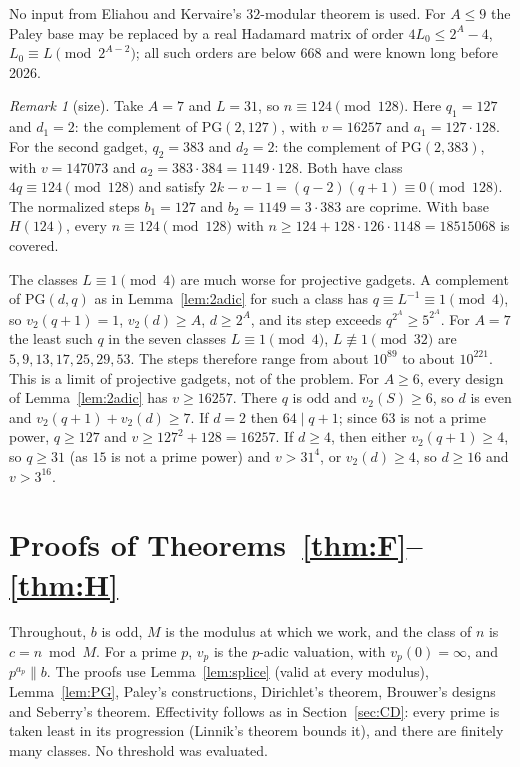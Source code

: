 \documentclass[10pt]{article}
\theoremstyle{remark}
\newtheorem*{remark}{Remark}
\newcommand{\PG}{\mathrm{PG}}
\begin{document}
No input from Eliahou and Kervaire's $32$-modular theorem is used. For $A\le9$ the Paley base may be replaced by a real Hadamard matrix of order $4L_0\le2^A-4$, $L_0\equiv L\pmod{2^{A-2}}$; all such orders are below $668$ and were known long before 2026.

\begin{remark}[size]\label{rem:size}
Take $A=7$ and $L=31$, so $n\equiv124\pmod{128}$. Here $q_1=127$ and $d_1=2$: the complement of $\PG(2,127)$, with $v=16257$ and $a_1=127\cdot128$. For the second gadget, $q_2=383$ and $d_2=2$: the complement of $\PG(2,383)$, with $v=147073$ and $a_2=383\cdot384=1149\cdot128$. Both have class $4q\equiv124\pmod{128}$ and satisfy $2k-v-1=(q-2)(q+1)\equiv0\pmod{128}$. The normalized steps $b_1=127$ and $b_2=1149=3\cdot383$ are coprime. With base $H(124)$, every $n\equiv124\pmod{128}$ with $n\ge124+128\cdot126\cdot1148=18515068$ is covered.

The classes $L\equiv1\pmod4$ are much worse for projective gadgets. A complement of $\PG(d,q)$ as in Lemma~\ref{lem:2adic} for such a class has $q\equiv L^{-1}\equiv1\pmod4$, so $v_2(q+1)=1$, $v_2(d)\ge A$, $d\ge2^A$, and its step exceeds $q^{2^A}\ge5^{2^A}$. For $A=7$ the least such $q$ in the seven classes $L\equiv1\pmod 4$, $L\not\equiv1\pmod{32}$ are $5,9,13,17,25,29,53$. The steps therefore range from about $10^{89}$ to about $10^{221}$. This is a limit of projective gadgets, not of the problem. For $A\ge6$, every design of Lemma~\ref{lem:2adic} has $v\ge16257$. There $q$ is odd and $v_2(S)\ge6$, so $d$ is even and $v_2(q+1)+v_2(d)\ge7$. If $d=2$ then $64\mid q+1$; since $63$ is not a prime power, $q\ge127$ and $v\ge127^2+128=16257$. If $d\ge4$, then either $v_2(q+1)\ge4$, so $q\ge31$ (as $15$ is not a prime power) and $v>31^4$, or $v_2(d)\ge4$, so $d\ge16$ and $v>3^{16}$.
\end{remark}

\section{Proofs of Theorems~\ref{thm:F}--\ref{thm:H}}\label{sec:FGH}
Throughout, $b$ is odd, $M$ is the modulus at which we work, and the class of $n$ is $c=n\bmod M$. For a prime $p$, $v_p$ is the $p$-adic valuation, with $v_p(0)=\infty$, and $p^{a_p}\parallel b$. The proofs use Lemma~\ref{lem:splice} (valid at every modulus), Lemma~\ref{lem:PG}, Paley's constructions, Dirichlet's theorem, Brouwer's designs and Seberry's theorem. Effectivity follows as in Section~\ref{sec:CD}: every prime is taken least in its progression (Linnik's theorem bounds it), and there are finitely many classes. No threshold was evaluated.
\end{document}
